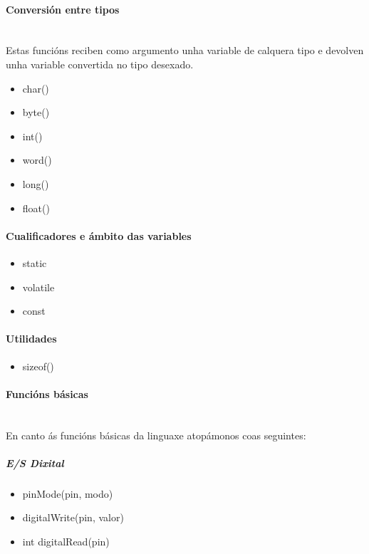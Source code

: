    \paragraph{Conversión entre tipos}\mbox{}\\

   Estas funcións reciben como argumento unha variable de calquera tipo e
   devolven unha variable convertida no tipo desexado.

   \begin{itemize}
    \item char()
    \item byte()
    \item int()
    \item word()
    \item long()
    \item float()
   \end{itemize}

   \paragraph{Cualificadores e ámbito das variables}

   \begin{itemize}
    \item static
    \item volatile
    \item const
   \end{itemize}

   \paragraph{Utilidades}

   \begin{itemize}
    \item sizeof()
   \end{itemize}

   \paragraph{Funcións básicas}\mbox{}\\

   En canto ás funcións básicas da linguaxe atopámonos coas seguintes:

    \subparagraph{E/S Dixital}

    \begin{itemize}
     \item pinMode(pin, modo)
     \item digitalWrite(pin, valor)
     \item int digitalRead(pin)
    \end{itemize}

